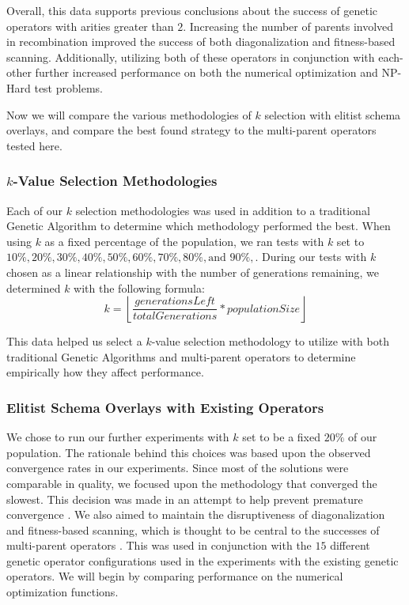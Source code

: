 Overall, this data supports previous conclusions about the success of genetic operators with arities greater than $2$. Increasing the number of parents involved in recombination improved the success of both diagonalization and fitness-based scanning. Additionally, utilizing both of these operators in conjunction with each-other further increased performance on both the numerical optimization and NP-Hard test problems. 

Now we will compare the various methodologies of $k$ selection with elitist schema overlays, and compare the best found strategy to the multi-parent operators tested here. 

\subsubsection*{$k$-Value Selection Methodologies}
Each of our $k$ selection methodologies was used in addition to a traditional Genetic Algorithm to determine which methodology performed the best. When using $k$ as a fixed percentage of the population, we ran tests with $k$ set to $10\%, 20\%, 30\%, 40\%, 50\%, 60\%, 70\%, 80\%,\text{and } 90\%,$. During our tests with $k$ chosen as a linear relationship with the number of generations remaining, we determined $k$ with the following formula:
\[
k = \left\lfloor \frac{generationsLeft}{totalGenerations} * populationSize \right\rfloor
\]

This data helped us select a $k$-value selection methodology to utilize with both traditional Genetic Algorithms and multi-parent operators to determine empirically how they affect performance.

\subsubsection*{Elitist Schema Overlays with Existing Operators}
We chose to run our further experiments with $k$ set to be a fixed $20\%$ of our population. The rationale behind this choices was based upon the observed convergence rates in our experiments. Since most of the solutions were comparable in quality, we focused upon the methodology that converged the slowest. This decision was made in an attempt to help prevent premature convergence \cite{Andre01}. We also aimed to maintain the disruptiveness of diagonalization and fitness-based scanning, which is thought to be central to the successes of multi-parent operators \cite{Eiben95}. This was used in conjunction with the $15$ different genetic operator configurations used in the experiments with the existing genetic operators. We will begin by comparing performance on the numerical optimization functions.

